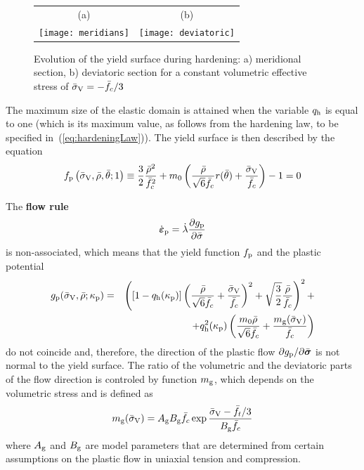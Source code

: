 \documentclass[a4paper]{article}
\newcommand{\mbf}[1]{\mbox{\boldmath$#1$}}
\newcommand{\bea}{\begin{eqnarray}}
\newcommand{\eea}{\end{eqnarray}}
\newcommand{\eps} {\mbf{\varepsilon}}
\newcommand{\vsig}{\mbf{\sigma}}%
\begin{document}
\begin{figure}[!htb]
\centering
\begin{tabular}{cc}
(a) & (b)
\\
 \texttt{[image: meridians]}&
 \texttt{[image: deviatoric]}
\end{tabular} 
\caption{Evolution of the yield surface during hardening:
a) meridional section, b) deviatoric section for a constant volumetric effective stress of $\bar{\sigma}_{\rm V} = -\bar{f}_c/3$} 
\label{fig:surfaceMerDev}
\end{figure}

The maximum size of the elastic domain is attained when the variable $q_{\rm h}$ is equal to one (which is its maximum value, as follows from the hardening law, to be specified in~(\ref{eq:hardeningLaw})). The yield surface is then described by the equation
%
\begin{equation}\label{eq:failureSurface}
f_{\rm p}\left(\bar{\sigma}_{\rm V},\bar{\rho},\bar{\theta};1\right) \equiv \frac{3}{2} \frac{\bar{\rho}^2}{\bar{f}_c^2} + m_0 \left(\frac{\bar{\rho} }{\sqrt{6}\bar{f}_c}r(\bar{\theta}) + \frac{\bar{\sigma}_{\rm V}}{\bar{f}_c} \right) - 1 = 0
\end{equation}

The {\bf flow rule} 
%
\begin{equation} \label{eq:flowRuleDPM}
\dot{\mbf{\eps}}_{\rm p} = \dot{\lambda} \frac{\partial g_{\rm p}}{\partial\bar{\sigma}} 
\end{equation}
%
is non-associated, which means that the yield function $f_{\rm p}$ and the plastic potential 
\bea\nonumber
g_{\rm p}(\bar{\sigma}_{\rm V},\bar{\rho};\kappa_{\rm p})&=&\left(\left[1-q_{\rm{h}}(\kappa_{\rm p})\right] \left( \frac{\bar{\rho}} {\sqrt{6}\fc} + \frac{\bar{\sigma}_{\rm V}}{\fc} \right)^2 + \sqrt{\frac{3}{2}} \frac {\bar{\rho}}{\fc} \right)^2 +\\
&&+q_{\rm{h}}^2(\kappa_{\rm p}) \left( \frac{m_0 \bar{\rho}}{\sqrt{6}\fc} + \frac{m_{\rm g}(\bar{\sigma}_{\rm V})}{\fc} \right)
 \label{eq:plasticPotential}
\eea
do not coincide and, therefore, the direction of the plastic flow $\partial g_{\rm p}/\partial\bar{\vsig}$ is not normal to the yield surface.
The ratio of the volumetric and the deviatoric parts of the flow direction is controled by function $m_{\rm g}$, which depends on the volumetric stress and is defined as 
\begin{equation} \label{eq:mg}
m_{\rm g}(\bar{\sigma}_{\rm V})=A_{\rm g}B_{\rm g}\bar{f}_c \exp{\frac{\bar{\sigma}_{\rm V} -\bar{f}_t/3}{B_{\rm g}\bar{f}_c}}
\end{equation}
%
where $A_{\rm g}$ and $B_{\rm g}$ are model parameters that are determined from certain assumptions on the plastic flow in uniaxial tension and compression.
\end{document}
